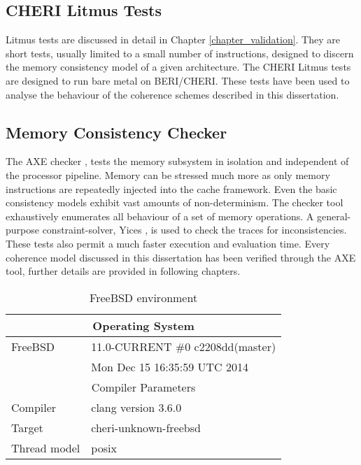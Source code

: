 	\subsection{CHERI Litmus Tests}
		Litmus tests are discussed in detail in Chapter \ref{chapter_validation}. They are short tests, usually limited to a small number of instructions, designed to discern the memory consistency model of a given architecture. The CHERI Litmus tests \cite{CHERI_litmus} are designed to run bare metal on BERI/CHERI. These tests have been used to analyse the behaviour of the coherence schemes described in this dissertation.
		
	\subsection{Memory Consistency Checker}
		The AXE checker \cite{AXE_checker,bluecheck}, tests the memory subsystem in isolation and independent of the processor pipeline. Memory can be stressed much more as only memory instructions are repeatedly injected into the cache framework. Even the basic consistency models exhibit vast amounts of non-determinism. The checker tool exhaustively enumerates all behaviour of a set of memory operations. A general-purpose constraint-solver, Yices \cite{Yices15}, is used to check the traces for inconsistencies. These tests also permit a much faster execution and evaluation time. Every coherence model discussed in this dissertation has been verified through the AXE tool, further details are provided in following chapters.

		\begin{table}[b]
		\begin{center}
		\begin{tabular}{|l|l|}
			\hline		
			\multicolumn{2}{|c|}{Operating System} \\
			\hline
			FreeBSD & 11.0-CURRENT \#0 c2208dd(master) \\
			& Mon Dec 15 16:35:59 UTC 2014 \\
			\hline
			\hline		
			\multicolumn{2}{|c|}{Compiler Parameters} \\
			\hline	
			Compiler & clang version 3.6.0 \\
			Target & cheri-unknown-freebsd \\
			Thread model & posix \\
			\hline
		\end{tabular}
		\caption{FreeBSD environment}
		\label{freebsd_info}
		\end{center} 
		\end{table}
		
